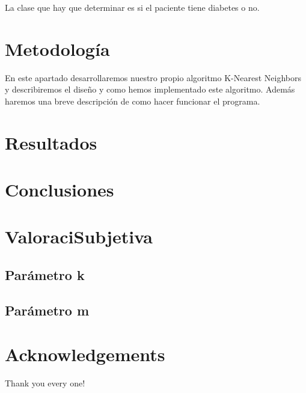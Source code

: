 \documentclass[a4paper,10pt]{article}
\theoremstyle{plain}
\begin{document}
La clase que hay que determinar es si el paciente tiene diabetes o no.
    
\section{Metodolog\'ia}

En este apartado desarrollaremos nuestro propio algoritmo K-Nearest Neighbors y describiremos el diseño y como hemos implementado este algoritmo. Adem\'as haremos una breve descripci\'on de como hacer funcionar el programa.


\section{Resultados}

\section{Conclusiones}

\section{Valoraci\on Subjetiva}
\subsection{Par\'ametro {\color{blue}k}}
\subsection{Par\'ametro {\color{magenta}m}}

\section*{Acknowledgements}
Thank you every one!



\end{document}
